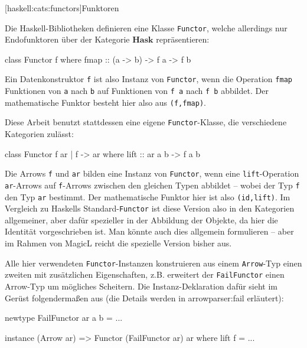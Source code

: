 \documentclass[12pt, a4paper, bibgerm]{scrbook}
\newenvironment{DIFnomarkup}{}{}
\newcommand\icode[1]{\lstinline?#1?}
\newcommand\lsubsection{}
\newcommand\sref{}
\begin{document}
\lsubsection[haskell:cats:functors]{Funktoren}

Die Haskell-Bibliotheken definieren eine Klasse \icode{Functor}, welche
allerdings nur Endofunktoren über der Kategorie $\mathbf{Hask}$ repräsentieren:
\begin{DIFnomarkup}\begin{code}
class Functor f where
  fmap :: (a -> b) -> f a -> f b
\end{code}\end{DIFnomarkup}
Ein Datenkonstruktor \icode{f} ist also Instanz von \icode{Functor},
wenn die Operation \icode{fmap} Funktionen von \icode{a} nach \icode{b}
auf Funktionen von \icode{f a} nach \icode{f b} abbildet. Der
mathematische Funktor besteht hier also aus \icode{(f,fmap)}.

Diese Arbeit benutzt stattdessen eine eigene \icode{Functor}-Klasse,
die verschiedene Kategorien zulässt:
\begin{DIFnomarkup}\begin{code}
class Functor f ar | f -> ar where
  lift :: ar a b -> f a b
\end{code}\end{DIFnomarkup}
Die Arrows \icode{f} und \icode{ar} bilden eine Instanz von
\icode{Functor}, wenn eine \icode{lift}-Operation \icode{ar}-Arrows auf
\icode{f}-Arrows zwischen den gleichen Typen abbildet -- wobei der Typ
\icode{f} den Typ \icode{ar} bestimmt. Der mathematische Funktor
hier ist also \icode{(id,lift)}. Im Vergleich zu Haskells
Standard-\icode{Functor} ist diese Version also in den Kategorien
allgemeiner, aber dafür spezieller in der Abbildung der Objekte, da hier
die Identität vorgeschrieben ist. Man könnte auch dies allgemein
formulieren -- aber im Rahmen von MagicL reicht die spezielle Version
bisher aus.

Alle hier verwendeten \icode{Functor}-Instanzen konstruieren aus einem
\icode{Arrow}-Typ einen zweiten mit zusätzlichen Eigenschaften,
z.B. erweitert der \icode{FailFunctor} einen Arrow-Typ um mögliches
Scheitern. Die Instanz-Deklaration dafür sieht im Gerüst folgendermaßen
aus (die Details werden in \sref{arrowparser:fail} erläutert):
\begin{DIFnomarkup}\begin{code}
newtype FailFunctor ar a b = ...

instance (Arrow ar) => Functor (FailFunctor ar) ar where
  lift f = ...
\end{code}\end{DIFnomarkup}
\end{document}
